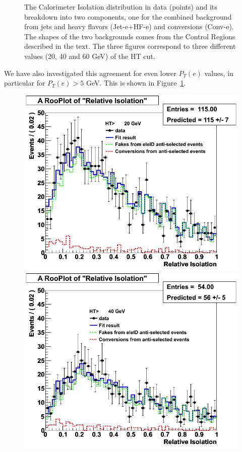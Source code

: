 \begin{figure}[ht]
\caption{The Calorimeter Isolation distribution in data (points) and its breakdown into two components, one for the combined background from jets and heavy flavors (Jet-e+HF-e) and conversions (Conv-e).  The shapes of the two backgrounds comes from the Control Regions described in the text.  The three figures correspond to three different values (20, 40 and 60 GeV) of the HT cut.}\label{fig:caloIso_fit_HT}
\end{figure}

We have also investigated this agreement for even lower $P_T(e)$ values, in particular for $P_T(e)>5$ GeV.  This is shown in Figure~\ref{fig:caloIso_fit_HT}.  

\begin{figure}[h!]
\centering
\includegraphics[scale=0.28]{Plots/caloIso_pt5_ht20.png}
\includegraphics[scale=0.28]{Plots/caloIso_pt5_ht40.png}

\end{figure}
